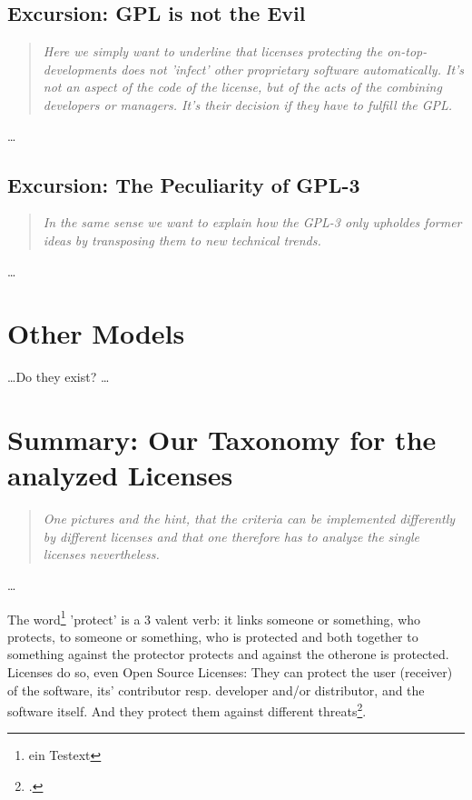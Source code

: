 \subsection{Excursion: GPL is not the Evil}
\footnotesize
\begin{quote}\itshape
Here we simply want to underline that licenses protecting the
on-top-developments does not 'infect' other proprietary software automatically.
It's not an aspect of the code of the license, but of the acts of the combining
developers or managers. It's their decision if they have to fulfill the GPL.
\end{quote}
\normalsize
\ldots

\subsection{Excursion: The Peculiarity of GPL-3}
\footnotesize
\begin{quote}\itshape
In the same sense we want to explain how the GPL-3 only upholdes former ideas by
transposing them to new technical trends.
\end{quote}
\normalsize
\ldots

\section{Other Models}
\ldots Do they exist? \ldots

\section{Summary: Our Taxonomy for the analyzed Licenses}
\footnotesize
\begin{quote}\itshape
One pictures and the hint, that the criteria can be implemented differently by
different licenses and that one therefore has to analyze the single licenses
nevertheless.
\end{quote}
\normalsize
\ldots


The word\footnote{ein Testext} 'protect' is a 3 valent verb: it links someone or something, who
protects, to someone or something, who is protected and both together to
something against the protector protects and against the otherone is protected.
Licenses do so, even Open Source Licenses: They can protect the user (receiver)
of the software, its' contributor resp. developer and/or distributor, and the
software itself. And they protect them against different
threats\footcite[cf.][\nopage et passim]{CoaBow2004a}.


